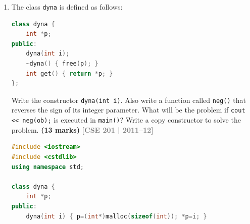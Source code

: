 \documentclass[12pt,a3paper]{article}
\newcommand{\yr}[1]{\hfill\textcolor{gray}{\small\textbf{[#1]}}}
\newcommand{\mk}[1]{\textcolor{orange!70!black}{\small\textbf{(#1 marks)}}}
\begin{document}
\begin{enumerate}
\begin{tcolorbox}[enhanced,breakable,ansbox,colback=cE!4,colframe=cE,
  boxrule=0.8pt,arc=5pt,
  title={\textbf{Answer --- array class shallow copy problem in print()}},
  fonttitle=\bfseries\color{white},colbacktitle=cE]

\textbf{Problem:} \texttt{array x = ob;} inside \texttt{print()}
does a shallow copy.  Both \texttt{x.p} and \texttt{ob.p} (i.e.\
\texttt{num.p}) point to the same array.  When \texttt{print}
returns and \texttt{x} is destroyed, its destructor frees the shared
array.  The loop in \texttt{main} then accesses freed memory
(undefined behaviour), and \texttt{num}'s destructor causes a
double-free crash.

\textbf{Fix --- deep copy constructor:}
\begin{lstlisting}[language=C++]
array(const array& obj) {
    size = obj.size;
    p = new int[size];
    for (int i=0; i<size; i++) p[i] = obj.p[i];
}
\end{lstlisting}

\end{tcolorbox}

\item The class \texttt{dyna} is defined as follows:
\begin{lstlisting}[language=C++]
class dyna {
    int *p;
public:
    dyna(int i);
    ~dyna() { free(p); }
    int get() { return *p; }
};
\end{lstlisting}
Write the constructor \texttt{dyna(int i)}. Also write a function called \texttt{neg()} that reverses the sign of its integer parameter. What will be the problem if \texttt{cout << neg(ob);} is executed in \texttt{main()}? Write a copy constructor to solve the problem. \mk{13}
\yr{CSE 201 | 2011--12}


\begin{tcolorbox}[enhanced,breakable,ansbox,colback=cE!4,colframe=cE,
  boxrule=0.8pt,arc=5pt,
  title={\textbf{Answer --- dyna class --- constructor, neg(), copy constructor}},
  fonttitle=\bfseries\color{white},colbacktitle=cE]

\begin{lstlisting}[language=C++]
#include <iostream>
#include <cstdlib>
using namespace std;

class dyna {
    int *p;
public:
    dyna(int i) { p=(int*)malloc(sizeof(int)); *p=i; }


\end{lstlisting}
\end{tcolorbox}
\end{enumerate}
\end{document}
